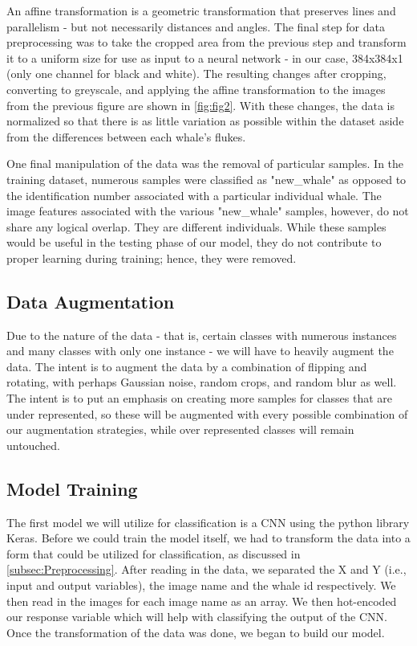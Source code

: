 \documentclass[paper=a4, fontsize=11pt]{scrartcl}
\numberwithin{equation}{section}		%
\numberwithin{table}{section}				%
\begin{document}
An affine transformation is a geometric transformation that preserves lines and parallelism - but not necessarily distances and angles. The final step for data preprocessing was to take the cropped area from the previous step and transform it to a uniform size for use as input to a neural network - in our case, 384x384x1 (only one channel for black and white). The resulting changes after cropping, converting to greyscale, and applying the affine transformation to the images from the previous figure are shown in \autoref{fig:fig2}. With these changes, the data is normalized so that there is as little variation as possible within the dataset aside from the differences between each whale's flukes.

One final manipulation of the data was the removal of particular samples. In the training dataset, numerous samples were classified as "new\_whale" as opposed to the identification number associated with a particular individual whale. The image features associated with the various "new\_whale" samples, however, do not share any logical overlap. They are different individuals. While these samples would be useful in the testing phase of our model, they do not contribute to proper learning during training; hence, they were removed.

\subsection{Data Augmentation}\label{subsec:Augmentation}
Due to the nature of the data - that is, certain classes with numerous instances and many classes with only one instance - we will have to heavily augment the data. The intent is to augment the data by a combination of flipping and rotating, with perhaps Gaussian noise, random crops, and random blur as well. The intent is to put an emphasis on creating more samples for classes that are under represented, so these will be augmented with every possible combination of our augmentation strategies, while over represented classes will remain untouched. 

\subsection{Model Training}

The first model we will utilize for classification is a CNN using the python library Keras. Before we could train the model itself, we had to transform the data into a form that could be utilized for classification, as discussed in  \autoref{subsec:Preprocessing}. After reading in the data, we separated the X and Y (i.e., input and output variables), the image name and the whale id respectively. We then read in the images for each image name as an array. We then hot-encoded our response variable which will help with classifying the output of the CNN. Once the transformation of the data was done, we began to build our model.
\end{document}
